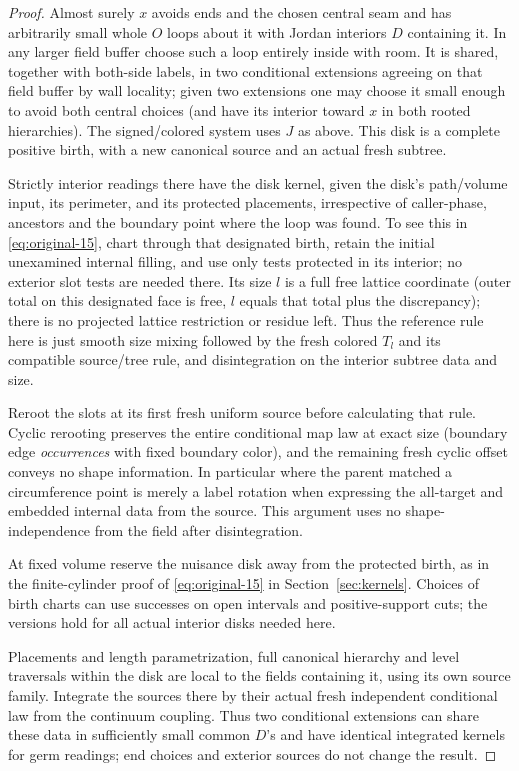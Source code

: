 \begin{proof}

Almost surely \(x\) avoids ends and the chosen central seam and has arbitrarily small whole \(O\)
loops about it with Jordan interiors \(D\) containing it. In any larger field buffer choose such a
loop entirely inside with room. It is shared, together with both-side labels, in two conditional
extensions agreeing on that field buffer by wall locality; given two extensions one may choose it
small enough to avoid both central choices (and have its interior toward \(x\) in both rooted
hierarchies). The signed/colored system uses \(J\) as above. This disk is a complete positive birth,
with a new canonical source and an actual fresh subtree.

Strictly interior readings there have the disk kernel, given the disk's path/volume input, its
perimeter, and its protected placements, irrespective of caller-phase, ancestors and the boundary
point where the loop was found. To see this in \eqref{eq:original-15}, chart through that designated
birth, retain the initial unexamined internal filling, and use only tests protected in its interior;
no exterior slot tests are needed there. Its size \(l\) is a full free lattice coordinate (outer
total on this designated face is free, \(l\) equals that total plus the discrepancy); there is no
projected lattice restriction or residue left. Thus the reference rule here is just smooth size
mixing followed by the fresh colored \(T_l\) and its compatible source/tree rule, and disintegration
on the interior subtree data and size.

Reroot the slots at its first fresh uniform source before calculating that rule. Cyclic rerooting
preserves the entire conditional map law at exact size (boundary edge \emph{occurrences} with fixed
boundary color), and the remaining fresh cyclic offset conveys no shape information. In particular
where the parent matched a circumference point is merely a label rotation when expressing the
all-target and embedded internal data from the source. This argument uses no shape-independence from
the field after disintegration.

At fixed volume reserve the nuisance disk away from the protected birth, as in the finite-cylinder
proof of \eqref{eq:original-15} in Section~\ref{sec:kernels}. Choices of birth charts can use
successes on open intervals and positive-support cuts; the versions hold for all actual interior
disks needed here.

Placements and length parametrization, full canonical hierarchy and level traversals within the disk
are local to the fields containing it, using its own source family. Integrate the sources there by
their actual fresh independent conditional law from the continuum coupling. Thus two conditional
extensions can share these data in sufficiently small common \(D\)'s and have identical integrated
kernels for germ readings; end choices and exterior sources do not change the result.


\end{proof}
